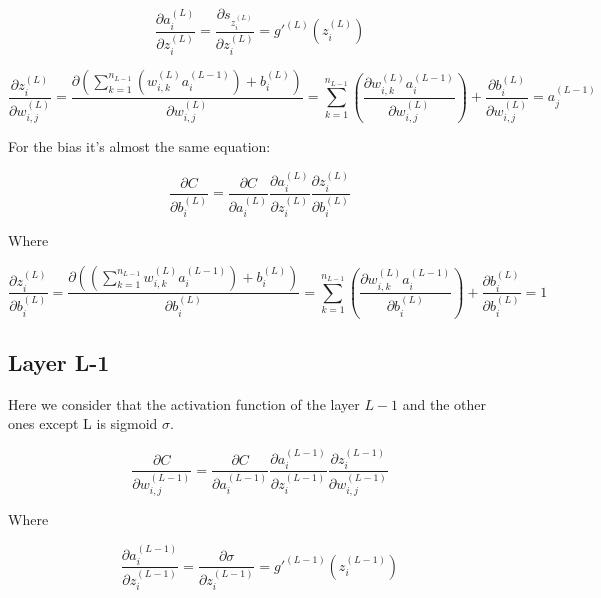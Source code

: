 \documentclass[11pt,a4paper]{report}
\begin{document}
\begin{equation*}
    \frac{\partial a_i^{(L)}}{\partial z_i^{(L)}} = \frac{\partial s_{z_i^{(L)}}}{\partial z_i^{(L)}} = g'^{(L)}(z_i^{(L)})
\end{equation*}

\begin{equation*}
    \frac{\partial z_i^{(L)}}{\partial w_{i,j}^{(L)}} = \frac{\partial \left( \sum\limits_{k=1}^{n_{L-1}} \left(w_{i,k}^{(L)} a_i^{(L-1)}\right) + b_i^{(L)}\right)}{\partial w_{i,j}^{(L)}} = \sum\limits_{k=1}^{n_{L-1}}\left( \frac{\partial w_{i,k}^{(L)} a_i^{(L-1)}}{\partial w_{i,j}^{(L)}}\right) + \frac{\partial b_i^{(L)}}{\partial w_{i,j}^{(L)}} = a_j^{(L-1)}
\end{equation*}

For the bias it's almost the same equation:

\begin{equation*}
    \frac{\partial C}{\partial b_i^{(L)}} = \frac{\partial C}{\partial a_i^{(L)}} \frac{\partial a_i^{(L)}}{\partial z_i^{(L)}} \frac{\partial z_i^{(L)}}{\partial b_i^{(L)}}
\end{equation*}

Where

\begin{equation*}
    \frac{\partial z_i^{(L)}}{\partial b_i^{(L)}} = \frac{\partial \left( \left(\sum\limits_{k=1}^{n_{L-1}} w_{i,k}^{(L)} a_i^{(L-1)}\right) + b_i^{(L)}\right)}{\partial b_i^{(L)}} = \sum\limits_{k=1}^{n_{L-1}}\left( \frac{\partial w_{i,k}^{(L)} a_i^{(L-1)}}{\partial b_i^{(L)}}\right) + \frac{\partial b_i^{(L)}}{\partial b_i^{(L)}} = 1 
\end{equation*}

\subsection{Layer L-1}


Here we consider that the activation function of the layer $L-1$ and the other ones except L is sigmoid $\sigma$.


\begin{equation*}
    \frac{\partial C}{\partial w_{i,j}^{(L-1)}} = \frac{\partial C}{\partial a_i^{(L-1)}} \frac{\partial a_i^{(L-1)}}{\partial z_i^{(L-1)}} \frac{\partial z_i^{(L-1)}}{\partial w_{i,j}^{(L-1)}}
\end{equation*}

Where

\begin{equation*}
    \frac{\partial a_i^{(L-1)}}{\partial z_i^{(L-1)}} = \frac{\partial \sigma}{\partial z_i^{(L-1)}} = g'^{(L-1)}(z_i^{(L-1)})
\end{equation*}
\end{document}
